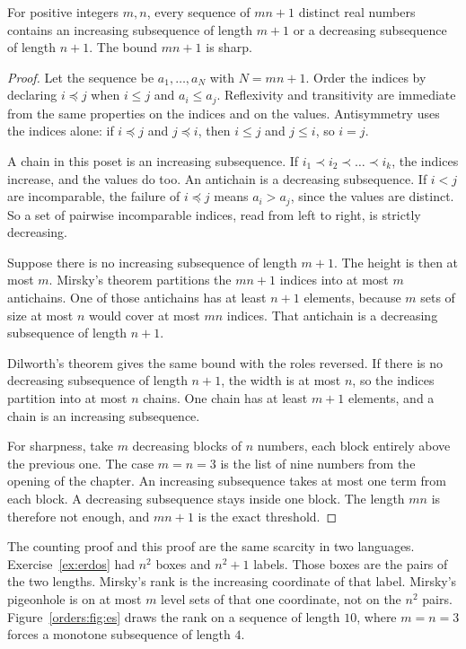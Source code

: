 \begin{theorem}\label{orders:thm:es}
For positive integers $m,n$, every sequence of $mn+1$ distinct real numbers contains an increasing subsequence of length $m+1$ or a decreasing subsequence of length $n+1$. The bound $mn+1$ is sharp.
\end{theorem}
\begin{proof}
Let the sequence be $a_1,\dots,a_N$ with $N=mn+1$. Order the indices by declaring $i\preceq j$ when $i\le j$ and $a_i\le a_j$. Reflexivity and transitivity are immediate from the same properties on the indices and on the values. Antisymmetry uses the indices alone: if $i\preceq j$ and $j\preceq i$, then $i\le j$ and $j\le i$, so $i=j$.

A chain in this poset is an increasing subsequence. If $i_1\prec i_2\prec\dots\prec i_k$, the indices increase, and the values do too. An antichain is a decreasing subsequence. If $i<j$ are incomparable, the failure of $i\preceq j$ means $a_i>a_j$, since the values are distinct. So a set of pairwise incomparable indices, read from left to right, is strictly decreasing.

Suppose there is no increasing subsequence of length $m+1$. The height is then at most $m$. Mirsky's theorem partitions the $mn+1$ indices into at most $m$ antichains. One of those antichains has at least $n+1$ elements, because $m$ sets of size at most $n$ would cover at most $mn$ indices. That antichain is a decreasing subsequence of length $n+1$.

Dilworth's theorem gives the same bound with the roles reversed. If there is no decreasing subsequence of length $n+1$, the width is at most $n$, so the indices partition into at most $n$ chains. One chain has at least $m+1$ elements, and a chain is an increasing subsequence.

For sharpness, take $m$ decreasing blocks of $n$ numbers, each block entirely above the previous one. The case $m=n=3$ is the list of nine numbers from the opening of the chapter. An increasing subsequence takes at most one term from each block. A decreasing subsequence stays inside one block. The length $mn$ is therefore not enough, and $mn+1$ is the exact threshold.
\end{proof}

The counting proof and this proof are the same scarcity in two languages. Exercise~\ref{ex:erdos} had $n^2$ boxes and $n^2+1$ labels. Those boxes are the pairs of the two lengths. Mirsky's rank is the increasing coordinate of that label. Mirsky's pigeonhole is on at most $m$ level sets of that one coordinate, not on the $n^2$ pairs. Figure~\ref{orders:fig:es} draws the rank on a sequence of length $10$, where $m=n=3$ forces a monotone subsequence of length $4$.

